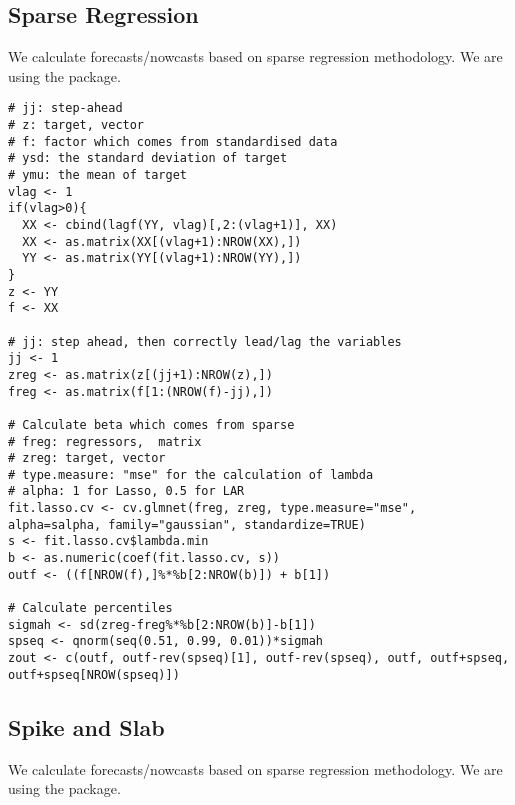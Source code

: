 \documentclass[12pt]{article}
\begin{document}
\subsection{Sparse Regression \textendash{} {\href{https://github.com/eurostat/econowcast/blob/master/nowcast/sparse.R}{}}}

We calculate forecasts/nowcasts based on sparse regression methodology. We are
using the  package.

\begin{lstlisting}[title=\textbf{Sparse regression.}]
# jj: step-ahead
# z: target, vector
# f: factor which comes from standardised data
# ysd: the standard deviation of target
# ymu: the mean of target
vlag <- 1
if(vlag>0){
  XX <- cbind(lagf(YY, vlag)[,2:(vlag+1)], XX)
  XX <- as.matrix(XX[(vlag+1):NROW(XX),])
  YY <- as.matrix(YY[(vlag+1):NROW(YY),])
}
z <- YY
f <- XX

# jj: step ahead, then correctly lead/lag the variables
jj <- 1
zreg <- as.matrix(z[(jj+1):NROW(z),])
freg <- as.matrix(f[1:(NROW(f)-jj),])

# Calculate beta which comes from sparse
# freg: regressors,  matrix
# zreg: target, vector
# type.measure: "mse" for the calculation of lambda
# alpha: 1 for Lasso, 0.5 for LAR
fit.lasso.cv <- cv.glmnet(freg, zreg, type.measure="mse", alpha=salpha, family="gaussian", standardize=TRUE)
s <- fit.lasso.cv$lambda.min
b <- as.numeric(coef(fit.lasso.cv, s))
outf <- ((f[NROW(f),]%*%b[2:NROW(b)]) + b[1])

# Calculate percentiles
sigmah <- sd(zreg-freg%*%b[2:NROW(b)]-b[1])
spseq <- qnorm(seq(0.51, 0.99, 0.01))*sigmah
zout <- c(outf, outf-rev(spseq)[1], outf-rev(spseq), outf, outf+spseq, outf+spseq[NROW(spseq)])
\end{lstlisting}

\subsection{Spike and Slab \textendash{} {\href{https://github.com/eurostat/econowcast/blob/master/nowcast/spike.R}{}}}

We calculate forecasts/nowcasts based on sparse regression methodology. We are
using the  package.
\end{document}
